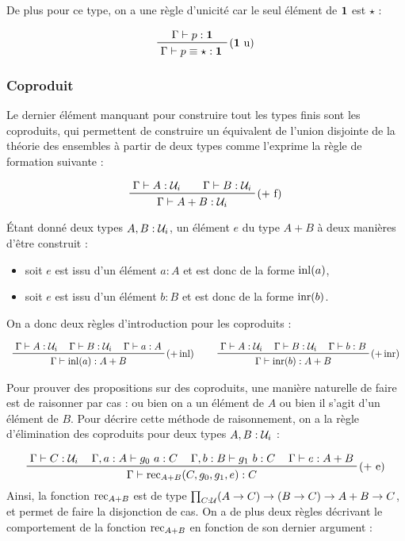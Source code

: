 \documentclass[../../rapport.tex]{subfiles}
\begin{document}
  De plus pour ce type, on a une règle d'unicité car le seul élément de $\operatorname{\textbf{1}}$ est $\star$ :

  $$
  \prfinterspace=2em
  \prftree[r]{($\1$ u)}
    {\Gamma \vdash p : \1}
    {\Gamma \vdash p \equiv \star : \1}
  $$

  \subsubsection{Coproduit}

  Le dernier élément manquant pour construire tout les types finis sont les coproduits,
  qui permettent de construire un équivalent de l'union disjointe de la théorie des ensembles à partir de deux types
  comme l'exprime la règle de formation suivante :

  $$
  \prfinterspace=2em
  \prftree[r]{($+$ f)}{\Gamma \vdash A : \U_i}{\Gamma \vdash B : \U_i}
    {\Gamma \vdash A + B : \U_i}
  $$

  Étant donné deux types $A, B : \mathcal U_i$, un élément $e$ du type $A + B$ à deux manières d'être construit :
  \begin{itemize}
    \item soit $e$ est issu d'un élément $a : A$ et est donc de la forme $\operatorname{inl}(a)$,
    \item soit $e$ est issu d'un élément $b : B$ et est donc de la forme $\operatorname{inr}(b)$.
  \end{itemize}
  On a donc deux règles d'introduction pour les coproduits :

  $$
  \prfinterspace=1.2em
  \begin{array}{cc}
    \prftree[r]{($+ \inl)$}{\Gamma \vdash A : \U_i}{\Gamma \vdash B : \U_i}{\Gamma \vdash a : A}{\Gamma \vdash \inl(a) : A + B} \hspace{0.5cm}
    & \prftree[r]{($+ \inr)$}{\Gamma \vdash A : \U_i}{\Gamma \vdash B : \U_i}{\Gamma \vdash b : B}{\Gamma \vdash \inr(b) : A + B}
  \end{array}
  $$

  Pour prouver des propositions sur des coproduits, une manière naturelle de faire est de raisonner par cas :
  ou bien on a un élément de $A$ ou bien il s'agit d'un élément de $B$.
  Pour décrire cette méthode de raisonnement, on a la règle d'élimination des coproduits pour deux types $A, B : \mathcal U_i$ :

  $$
  \prfinterspace=1.2em
  \prftree[r]{($+$ e)}{\Gamma \vdash C : \U_i}{\Gamma, a : A \vdash g_0\ a : C}{\Gamma, b : B \vdash g_1\ b : C}{\Gamma \vdash e : A + B}
    {\Gamma \vdash \rec_{A+B}(C, g_0, g_1, e) : C}
  $$
  Ainsi, la fonction $\operatorname{rec}_{A+B}$ est de type $\prod_{C : \mathcal U}(A \rightarrow C) \rightarrow (B \rightarrow C) \rightarrow A + B \rightarrow C$,
  et permet de faire la disjonction de cas.
  On a de plus deux règles décrivant le comportement de la fonction $\operatorname{rec}_{A+B}$ en fonction de son dernier argument :
\end{document}
